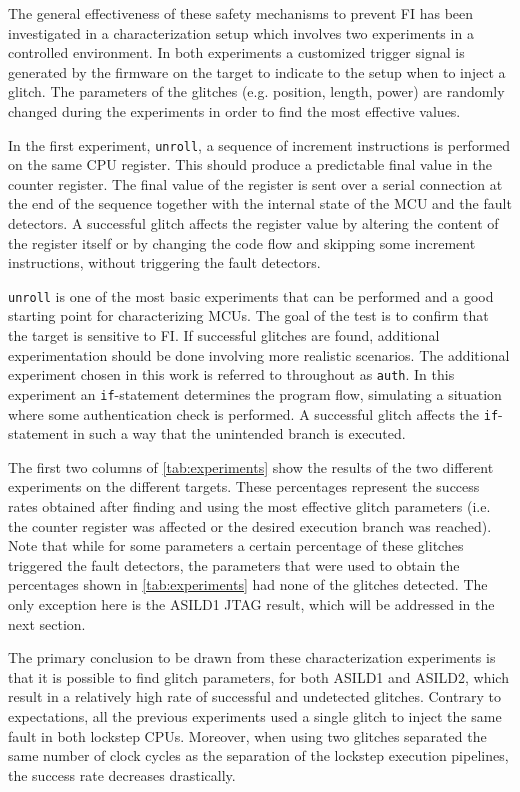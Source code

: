 \documentclass[a4paper, 10pt]{article}
\newcommand{\TI}{ASILD1\xspace}
\newcommand{\ST}{ASILD2\xspace}
\newcommand{\unroll}{\texttt{unroll}\xspace}
\newcommand{\auth}{\texttt{auth}\xspace}
\newcommand{\jtag}{JTAG\xspace}
\begin{document}
The general effectiveness of these safety mechanisms to prevent FI has been investigated in a characterization setup which involves two experiments in a controlled environment. In both experiments a customized trigger signal is generated by the firmware on the target to indicate to the setup when to inject a glitch. The parameters of the glitches (e.g. position, length, power) are randomly changed during the experiments in order to find the most effective values.

In the first experiment, \unroll, a sequence of increment instructions is performed on the same CPU register. This should produce a predictable final value in the counter register. The final value of the register is sent over a serial connection at the end of the sequence together with the internal state of the MCU and the fault detectors. A successful glitch affects the register value by altering the content of the register itself or by changing the code flow and skipping some increment instructions, without triggering the fault detectors.

\unroll is one of the most basic experiments that can be performed and a good starting point for characterizing MCUs. The goal of the test is to confirm that the target is sensitive to FI. If successful glitches are found, additional experimentation should be done involving more realistic scenarios. The additional experiment chosen in this work is referred to throughout as \auth. In this experiment an \texttt{if}-statement determines the program flow, simulating a situation where some authentication check is performed. A successful glitch affects the \texttt{if}-statement in such a way that the unintended branch is executed.

The first two columns of \autoref{tab:experiments} show the results of the two different experiments on the different targets. These percentages represent the success rates obtained after finding and using the most effective glitch parameters (i.e. the counter register was affected or the desired execution branch was reached). Note that while for some parameters a certain percentage of these glitches triggered the fault detectors, the parameters that were used to obtain the percentages shown in \autoref{tab:experiments} had none of the glitches detected. The only exception here is the \TI \jtag result, which will be addressed in the next section. 

The primary conclusion to be drawn from these characterization experiments is that it is possible to find glitch parameters, for both \TI and \ST, which result in a relatively high rate of successful and undetected glitches. Contrary to expectations, all the previous experiments used a single glitch to inject the same fault in both lockstep CPUs. Moreover, when using two glitches separated the same number of clock cycles as the separation of the lockstep execution pipelines, the success rate decreases drastically.
\end{document}
